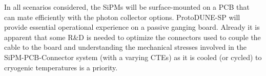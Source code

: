 In all scenarios considered, the SiPMs will be surface-mounted on a PCB that can mate efficiently with the photon
collector options. ProtoDUNE-SP will provide essential operational experience on a passive ganging board. 
Already it is apparent that some R\&D is needed to optimize the connectors used to couple the cable to the board and understanding the 
mechanical stresses involved in the SiPM-PCB-Connector system (with a varying CTEs) as it is cooled (or cycled) to cryogenic temperatures is a priority.










